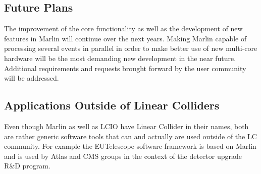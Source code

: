 \subsection{Future Plans}
The improvement of the core functionality as well as the development of new features in Marlin will continue over the next years. Making Marlin capable of processing several events in parallel in order to make better use of new multi-core hardware will be the most demanding new development in the near future. Additional requirements and requests brought forward by the user community will be addressed.

\subsection{Applications Outside of Linear Colliders}
Even though Marlin as well as LCIO have Linear Collider in their names, both are rather generic software tools that can and actually are used outside of the LC community. For example the EUTelescope software framework is based on Marlin and is used by Atlas and CMS groups in the context of the detector upgrade R\&D program.
